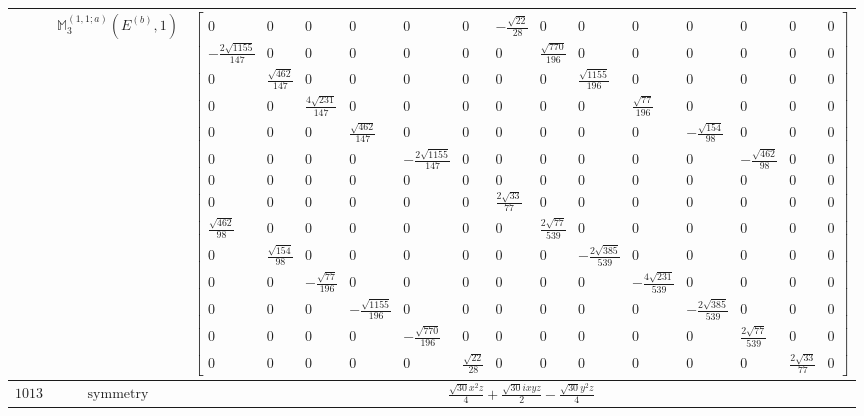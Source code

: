 \documentclass[fleqn,8pt,landscape]{jsarticle}
\begin{document}
\begin{longtable}{ccc}
$  $ & $ \mathbb{M}_{3}^{(1,1;a)}(E^{(b)},1) $ & $ \begin{bmatrix} 0 & 0 & 0 & 0 & 0 & 0 & - \frac{\sqrt{22}}{28} & 0 & 0 & 0 & 0 & 0 & 0 & 0 \\ - \frac{2 \sqrt{1155}}{147} & 0 & 0 & 0 & 0 & 0 & 0 & \frac{\sqrt{770}}{196} & 0 & 0 & 0 & 0 & 0 & 0 \\ 0 & \frac{\sqrt{462}}{147} & 0 & 0 & 0 & 0 & 0 & 0 & \frac{\sqrt{1155}}{196} & 0 & 0 & 0 & 0 & 0 \\ 0 & 0 & \frac{4 \sqrt{231}}{147} & 0 & 0 & 0 & 0 & 0 & 0 & \frac{\sqrt{77}}{196} & 0 & 0 & 0 & 0 \\ 0 & 0 & 0 & \frac{\sqrt{462}}{147} & 0 & 0 & 0 & 0 & 0 & 0 & - \frac{\sqrt{154}}{98} & 0 & 0 & 0 \\ 0 & 0 & 0 & 0 & - \frac{2 \sqrt{1155}}{147} & 0 & 0 & 0 & 0 & 0 & 0 & - \frac{\sqrt{462}}{98} & 0 & 0 \\ 0 & 0 & 0 & 0 & 0 & 0 & 0 & 0 & 0 & 0 & 0 & 0 & 0 & 0 \\ 0 & 0 & 0 & 0 & 0 & 0 & \frac{2 \sqrt{33}}{77} & 0 & 0 & 0 & 0 & 0 & 0 & 0 \\ \frac{\sqrt{462}}{98} & 0 & 0 & 0 & 0 & 0 & 0 & \frac{2 \sqrt{77}}{539} & 0 & 0 & 0 & 0 & 0 & 0 \\ 0 & \frac{\sqrt{154}}{98} & 0 & 0 & 0 & 0 & 0 & 0 & - \frac{2 \sqrt{385}}{539} & 0 & 0 & 0 & 0 & 0 \\ 0 & 0 & - \frac{\sqrt{77}}{196} & 0 & 0 & 0 & 0 & 0 & 0 & - \frac{4 \sqrt{231}}{539} & 0 & 0 & 0 & 0 \\ 0 & 0 & 0 & - \frac{\sqrt{1155}}{196} & 0 & 0 & 0 & 0 & 0 & 0 & - \frac{2 \sqrt{385}}{539} & 0 & 0 & 0 \\ 0 & 0 & 0 & 0 & - \frac{\sqrt{770}}{196} & 0 & 0 & 0 & 0 & 0 & 0 & \frac{2 \sqrt{77}}{539} & 0 & 0 \\ 0 & 0 & 0 & 0 & 0 & \frac{\sqrt{22}}{28} & 0 & 0 & 0 & 0 & 0 & 0 & \frac{2 \sqrt{33}}{77} & 0 \end{bmatrix} $ \\ \hline
$ 1013 $ & $ \text{symmetry} $ & $ \frac{\sqrt{30} x^{2} z}{4} + \frac{\sqrt{30} i x y z}{2} - \frac{\sqrt{30} y^{2} z}{4} $ \\

\end{longtable}
\end{document}
